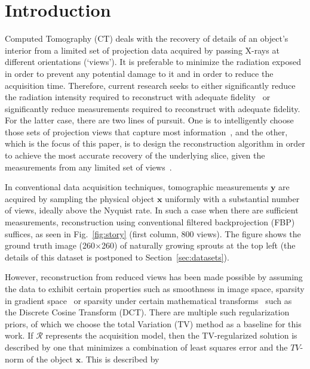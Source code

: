\documentclass[journal]{IEEEtran}
\begin{document}
\section{Introduction}
\label{sec:intro}
Computed Tomography (CT) deals with the recovery of details of an
object's interior from a limited set of projection data acquired by
passing X-rays at different orientations (`views'). It is preferable
to minimize the radiation exposed in order to prevent any potential
damage to it and in order to reduce the acquisition time. Therefore,
current research seeks to either significantly reduce the radiation
intensity required to reconstruct with adequate
fidelity~\cite{yang2018,Lin2016,Xie2017,gopal2019low} or significantly
reduce measurements required to reconstruct with
adequate fidelity. For the latter case, there are two lines of
pursuit. One is to intelligently choose those sets of projection views
that capture most
information~\cite{King2018,Anthony2018,barkan17,fischer16,andrei14},
and the other, which is the focus of this paper, is to design the
reconstruction algorithm in order to achieve the most accurate
recovery of the underlying slice, given the measurements from any
limited set of views~\cite{yang2018,geyer2015,kilic2011}.

In conventional data acquisition techniques, tomographic measurements
$\boldsymbol{y}$ are acquired by sampling the physical object
$\boldsymbol{x}$ uniformly with a substantial number of views, ideally
above the Nyquist rate. In such a case when there are sufficient
measurements, reconstruction using conventional filtered
backprojection (FBP) suffices, as seen in Fig.~\ref{fig:story} (first
column, 800 views). The figure shows the ground truth image
(260$\times$260) of naturally growing sprouts at the top left (the
details of this dataset is postponed to Section~\ref{sec:datasets}).

However, reconstruction from reduced views has been made possible by
assuming the data to exhibit certain properties such as smoothness in
image space, sparsity in gradient space~\cite{TV} or sparsity under
certain mathematical transforms~\cite{Donoho,introCS} such as the
Discrete Cosine Transform (DCT).  There are multiple such
regularization priors, of which we choose the total Variation (TV)
method as a baseline for this work. If $\boldsymbol{\mathcal{R}}$
represents the acquisition model, then the TV-regularized solution is
described by one that minimizes a combination of least squares error
and the $TV$-norm of the object $\boldsymbol{x}$. This is described by
\end{document}
